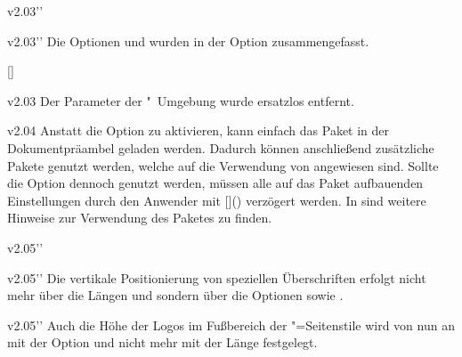 \begin{Obsolete}{v2.03}{}''
\begin{Obsolete}{v2.03}{}''
\printdeclarationlist%
%
Die Optionen  und  wurden in der Option 
 zusammengefasst.
\end{Obsolete}
\end{Obsolete}

\begin{Declaration'}{[]}
\begin{Obsolete}{v2.03}{}
\printdeclarationlist%
%
Der Parameter  der 
"~Umgebung wurde ersatzlos entfernt.
\end{Obsolete}
\end{Declaration'}


%
\begin{Obsolete}{v2.04}{}%
\printdeclarationlist%
%
Anstatt die Option  zu aktivieren, kann einfach das Paket 
 in der Dokumentpräambel geladen werden. Dadurch können 
anschließend zusätzliche Pakete genutzt werden, welche auf die Verwendung von 
 angewiesen sind. Sollte die Option  
dennoch genutzt werden, müssen alle auf das Paket  
aufbauenden Einstellungen durch den Anwender mit %
[\PParameter{\dots}]() verzögert 
werden. In  sind weitere Hinweise zur Verwendung des Paketes 
 zu finden.
\end{Obsolete}


%
\begin{Obsolete}{v2.05}{}''
\begin{Obsolete}{v2.05}{}''
\printdeclarationlist%
%
Die vertikale Positionierung von speziellen Überschriften erfolgt nicht mehr 
über die Längen  und  sondern 
über die Optionen  sowie .
\end{Obsolete}
\end{Obsolete}


\begin{Obsolete}{v2.05}{}''
\printdeclarationlist%
%
Auch die Höhe der Logos im Fußbereich der "=Seitenstile 
wird von nun an mit der Option  und nicht mehr mit der 
Länge  festgelegt.
\end{Obsolete}


